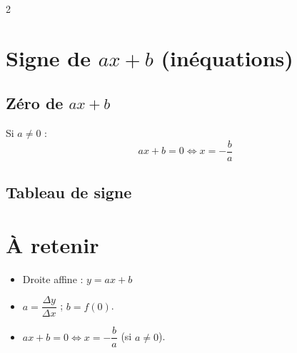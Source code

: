 \documentclass[11pt,a4paper]{article}
\begin{document}
\begin{paracol}{2}
\section{Signe de $ax+b$ (inéquations)}
\subsection{Zéro de $ax+b$}
Si $a\neq 0$ :
\[
ax+b=0 \iff x=-\frac{b}{a}
\]


\subsection{Tableau de signe}

\begin{center}
\end{center}

\section{À retenir}
\begin{itemize}
  \item Droite affine : $y=ax+b$
  \item $a=\dfrac{\Delta y}{\Delta x}$ ; $b=f(0)$.
  \item $ax+b=0 \iff x=-\dfrac{b}{a}$ (si $a\neq 0$).
\end{itemize}

\end{paracol}
\end{document}
